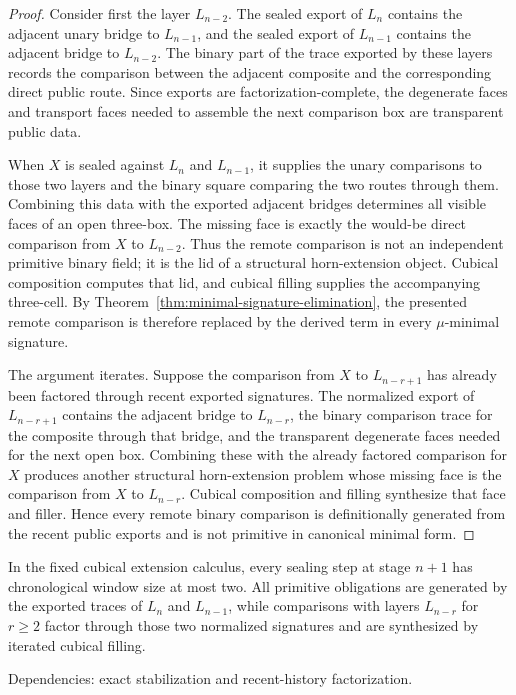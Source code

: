 \documentclass{lmcs}
\begin{document}
\begin{proof}
Consider first the layer \(L_{n-2}\).  The sealed export of \(L_n\) contains the adjacent
unary bridge to \(L_{n-1}\), and the sealed export of \(L_{n-1}\) contains the adjacent bridge
to \(L_{n-2}\).  The binary part of the trace exported by these layers records the comparison
between the adjacent composite and the corresponding direct public route.  Since exports are
factorization-complete, the degenerate faces and transport faces needed to assemble the next
comparison box are transparent public data.

When \(X\) is sealed against \(L_n\) and \(L_{n-1}\), it supplies the unary comparisons to
those two layers and the binary square comparing the two routes through them.  Combining
this data with the exported adjacent bridges determines all visible faces of an open
three-box.  The missing face is exactly the would-be direct comparison from \(X\) to
\(L_{n-2}\).  Thus the remote comparison is not an independent primitive binary field; it is
the lid of a structural horn-extension object.  Cubical composition computes that lid, and
cubical filling supplies the accompanying three-cell.  By Theorem~\ref{thm:minimal-signature-elimination},
the presented remote comparison is therefore replaced by the derived term in every
\(\mu\)-minimal signature.

The argument iterates.  Suppose the comparison from \(X\) to \(L_{n-r+1}\) has already
been factored through recent exported signatures.  The normalized export of \(L_{n-r+1}\)
contains the adjacent bridge to \(L_{n-r}\), the binary comparison trace for the composite
through that bridge, and the transparent degenerate faces needed for the next open box.
Combining these with the already factored comparison for \(X\) produces another structural
horn-extension problem whose missing face is the comparison from \(X\) to \(L_{n-r}\).
Cubical composition and filling synthesize that face and filler.  Hence every remote binary
comparison is definitionally generated from the recent public exports and is not primitive in
canonical minimal form.
\end{proof}

\begin{cor}
\label{cor:two-layer-window}
In the fixed cubical extension calculus, every sealing step at stage \(n+1\) has chronological
window size at most two.  All primitive obligations are generated by the exported traces of
\(L_n\) and \(L_{n-1}\), while comparisons with layers \(L_{n-r}\) for \(r\geq 2\) factor
through those two normalized signatures and are synthesized by iterated cubical filling.

Dependencies: exact stabilization and recent-history factorization.
\end{cor}
\end{document}
